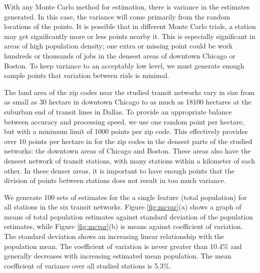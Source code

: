 \documentclass[11pt]{article}
\begin{document}
With any Monte Carlo method for estimation, there is variance in the estimates generated. In this case, the variance will come primarily from the random locations of the points. It is possible that in different Monte Carlo trials, a station may get significantly more or less points nearby it. This is especially significant in areas of high population density; one extra or missing point could be work hundreds or thousands of jobs in the densest areas of downtown Chicago or Boston. To keep variance to an acceptably low level, we must generate enough sample points that variation between rials is minimal. 

The land area of the zip codes near the studied transit networks vary in size from as small as 30 hectare in downtown Chicago to as much as 18100 hectares at the suburban end of transit lines in Dallas. To provide an appropriate balance between accuracy and processing speed, we use one random point per hectare, but with a minimum limit of 1000 points per zip code. This effectively provides over 10 points per hectare in for the zip codes in the densest parts of the studied networks: the downtown areas of Chicago and Boston. These areas also have the densest network of transit stations, with many stations within a kilometer of each other. In these denser areas, it is important to have enough points that the division of points between stations does not result in too much variance. 

We generate 100 sets of estimates for the a single feature (total population) for all stations in the six transit networks. Figure \ref{fig:mcvar}(a) shows a graph of means of total population estimates against standard deviation of the population estimates, while Figure \ref{fig:mcvar}(b) is means against coefficient of variation. The standard deviation shows an increasing linear relationship with the population mean. The coefficient of variation is never greater than 10.4\% and generally decreases with increasing estimated mean population. The mean coefficient of variance over all studied stations is 5.3\%. 
\end{document}
